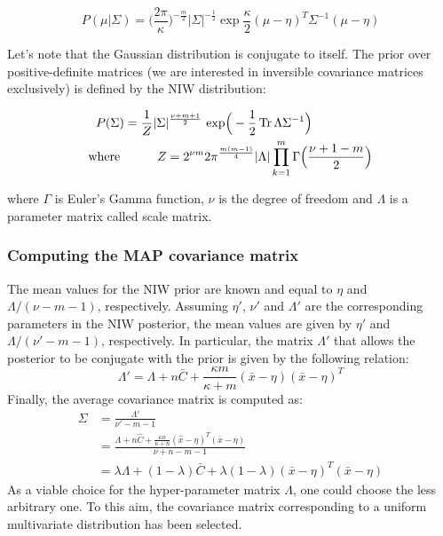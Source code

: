             \begin{equation}
                P(\mu \vert \Sigma) = \Big(\frac{2 \pi}{\kappa}\Big)^{-\frac{m}{2}} \vert\Sigma\vert^{-\frac{1}{2}}
                \exp{\frac{\kappa}{2} (\mu - \eta)^T \Sigma^{-1} (\mu - \eta)}
            \end{equation}

            Let's note that the Gaussian distribution is conjugate to itself. The prior over positive-definite matrices
            (we are interested in inversible covariance matrices exclusively) is defined by the NIW distribution:

            \begin{equation}
                \begin{split}
                    P(\Sigma) & = \frac{1}{Z} \vert\Sigma\vert^{\frac{\nu + m + 1}{2}} \text{ exp}\Big(-\frac{1}{2} \operatorname{Tr}{\Lambda \Sigma^{-1}}\Big) \\
                    \text{where } & \ \ \ \ \ \ \ \ Z = 2^{\nu m}{2} \pi^{\frac{m (m - 1)}{4}} \vert\Lambda\vert 
                    \prod\limits_{k=1}^{m} \Gamma\Big(\frac{\nu + 1 - m}{2}\Big)
                \end{split}
            \end{equation}

            where $\Gamma$ is Euler's Gamma function, $\nu$ is the degree of freedom and $\Lambda$ is a parameter matrix called scale matrix.
            
        \subsubsection{Computing the MAP covariance matrix}

            The mean values for the NIW prior are known and equal to $\eta$ and $\Lambda / (\nu - m - 1)$, respectively.
            Assuming $\eta'$, $\nu'$ and $\Lambda'$ are the corresponding parameters in the NIW posterior, the mean values are given by
            $\eta'$ and $\Lambda / (\nu' - m - 1)$, respectively. In particular, the matrix $\Lambda'$ that allows the posterior to be conjugate
            with the prior is given by the following relation:
            \begin{equation}
                \Lambda' = \Lambda + n \bar{C} + \frac{\kappa m}{\kappa + m} (\bar{x} - \eta) (\bar{x} - \eta)^T
            \end{equation}
            Finally, the average covariance matrix is computed as:
            \begin{align*}
                \Sigma & = \frac{\Lambda'}{\nu' - m - 1} \\
                & = \frac{\Lambda + n \hat{C} + \frac{\kappa n}{\kappa + n} (\hat{x} - \eta)^T (\bar{x} - \eta)}{\nu + n - m -1} \\
                & = \lambda \Lambda + (1 - \lambda) \bar{C} + \lambda (1 - \lambda) (\bar{x} - \eta)^T (\bar{x} - \eta)
            \end{align*}
            As a viable choice for the hyper-parameter matrix $\Lambda$, one could choose the less arbitrary one. To this aim, the covariance
            matrix corresponding to a uniform multivariate distribution has been selected.
